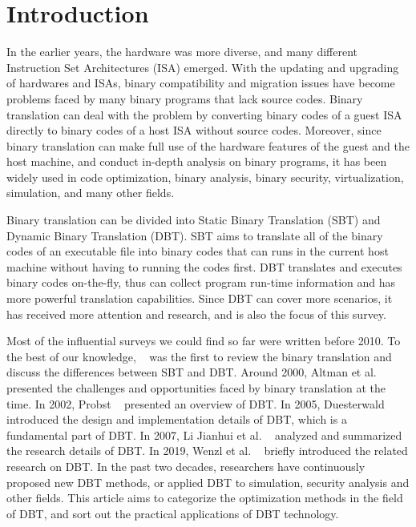 \section{Introduction}

In the earlier years, the hardware was more diverse, and many different Instruction Set Architectures (ISA) emerged.
With the updating and upgrading of hardwares and ISAs, binary compatibility and migration issues have become problems faced by many binary programs that lack source codes.
Binary translation can deal with the problem by converting binary codes of a guest ISA directly to binary codes of a host ISA without source codes.
Moreover, since binary translation can make full use of the hardware features of the guest and the host machine, and conduct in-depth analysis on binary programs, it has been widely used in code optimization, binary analysis, binary security, virtualization, simulation, and many other fields. 

Binary translation can be divided into Static Binary Translation (SBT) and Dynamic Binary Translation (DBT).
SBT aims to translate all of the binary codes of an executable file into binary codes that can runs in the current host machine without having to running the codes first.
DBT translates and executes binary codes on-the-fly, thus can collect program run-time information and has more powerful translation capabilities.
Since DBT can cover more scenarios, it has received more attention and research, and is also the focus of this survey.

Most of the influential surveys we could find so far were written before 2010.
To the best of our knowledge, ~\cite{DBLP:conf/icsm/CifuentesM96} was the first to review the binary translation and discuss the differences between SBT and DBT.
Around 2000, Altman et al.~\cite{DBLP:journals/pieee/AltmanEGS01}\cite{DBLP:journals/computer/AltmanKS00} presented the challenges and opportunities faced by binary translation at the time.
In 2002, Probst ~\cite{probst2002dynamic} presented an overview of DBT.
In 2005, Duesterwald~\cite{DBLP:journals/pieee/Duesterwald05} introduced the design and implementation details of DBT, which is a fundamental part of DBT.
In 2007, Li Jianhui et al. ~\cite{Li2007} analyzed and summarized the research details of DBT.
In 2019, Wenzl et al. ~\cite{DBLP:journals/csur/WenzlMUW19} briefly introduced the related research on DBT.
In the past two decades, researchers have continuously proposed new DBT methods, or applied DBT to simulation, security analysis and other fields.
This article aims to categorize the optimization methods in the field of DBT, and sort out the practical applications of DBT technology.

